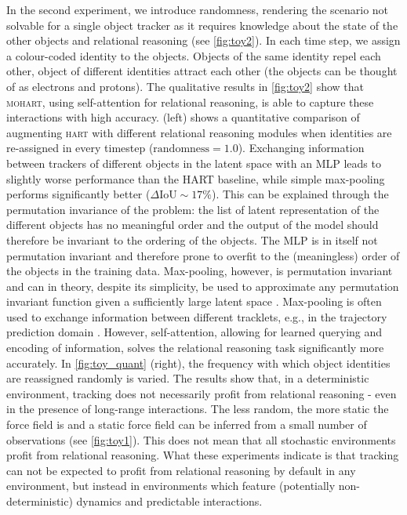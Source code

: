 In the second experiment, we introduce randomness, rendering the scenario not solvable for a single object tracker as it requires knowledge about the state of the other objects and relational reasoning (see \cref{fig:toy2}). In each time step, we assign a colour-coded identity to the objects. Objects of the same identity repel each other, object of different identities attract each other (the objects can be thought of as electrons and protons). The qualitative results in \cref{fig:toy2} show that \textsc{mohart}, using self-attention for relational reasoning, is able to capture these interactions with high accuracy.
 (left) shows a quantitative comparison of augmenting \textsc{hart} with different relational reasoning modules when identities are re-assigned in every timestep ($\text{randomness} = 1.0$). Exchanging information between trackers of different objects in the latent space with an MLP leads to slightly worse performance than the \textsc{HART} baseline, while simple max-pooling performs significantly better ($\Delta \text{IoU} \sim 17\%$). This can be explained through the permutation invariance of the problem: the list of latent representation of the different objects has no meaningful order and the output of the model should therefore be invariant to the ordering of the objects. The MLP is in itself not permutation invariant and therefore prone to overfit to the (meaningless) order of the objects in the training data. Max-pooling, however, is permutation invariant and can in theory, despite its simplicity, be used to approximate any permutation invariant function given a sufficiently large latent space \citep{Wagstaff2019}. Max-pooling is often used to exchange information between different tracklets, e.g., in the trajectory prediction domain \citep{Alahi2016social,Gupta2019social}. However, self-attention, allowing for learned querying and encoding of information, solves the relational reasoning task significantly more accurately. In \cref{fig:toy_quant} (right), the frequency with which object identities are reassigned randomly is varied. The results show that, in a deterministic environment, tracking does not necessarily profit from relational reasoning - even in the presence of long-range interactions. The less random, the more static the force field is and a static force field can be inferred from a small number of observations (see \cref{fig:toy1}). This does not mean that all stochastic environments profit from relational reasoning. What these experiments indicate is that tracking can not be expected to profit from relational reasoning by default in any environment, but instead in environments which feature (potentially non-deterministic) dynamics and predictable interactions.